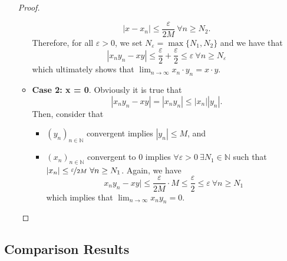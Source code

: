 \documentclass{article}
\newcommand{\N}{\mathbb{N}}
\newcommand{\seq}[2]{(#1_{#2})_{#2 \in \N}}
\newcommand{\?}{\stackrel{?}{=}}
\newcommand{\smallblacksquare}{\rule{0.5em}{0.5em}}
\theoremstyle{definition} %
\begin{document}
\begin{itemize}
\begin{proof}
\begin{itemize}[label=\smallblacksquare]
                        $$|x - x_n| \leq \frac{\varepsilon}{2M} \ \forall n \geq N_2.$$
                        Therefore, for all $\varepsilon > 0$, we set $N_\varepsilon = \max\{N_1, N_2\}$ and we have that
                        $$|x_ny_n - xy| \leq \frac{\varepsilon}{2} + \frac{\varepsilon}{2} \leq \varepsilon \ \forall n \geq N_\varepsilon$$
                        which ultimately shows that $\lim_{n \to \infty} x_n \cdot y_n = x \cdot y$.
                  \item \textbf{Case 2: x = 0}. Obviously it is true that
                        $$|x_ny_n - xy| = |x_ny_n| \leq |x_n||y_n|.$$
                        Then, consider that
                        \begin{itemize}
                            \item $\seq{y}{n}$ convergent implies $|y_n| \leq M$, and
                            \item $\seq{x}{n}$ convergent to 0 implies $\forall \varepsilon > 0 \ \exists N_1 \in \N$ such that $|x_n| \leq \nicefrac{\varepsilon}{2M} \ \forall n \geq N_1$. Again, we have
                                  $$x_ny_n - xy| \leq \frac{\varepsilon}{2M} \cdot M \leq \frac{\varepsilon}{2} \leq \varepsilon \ \forall n \geq N_1$$
                                  which implies that $\lim_{n \to \infty} x_ny_n = 0$.
                        \end{itemize}
              \end{itemize}
          \end{proof}
\end{itemize}

\subsection{Comparison Results}
\end{document}
